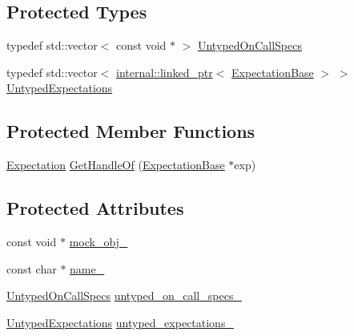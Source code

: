 \subsection*{Protected Types}
\begin{DoxyCompactItemize}
\item 
typedef std\+::vector$<$ const void $\ast$ $>$ \hyperlink{classtesting_1_1internal_1_1_untyped_function_mocker_base_a29cc87ed60ad0218432aa777abba7dbb}{Untyped\+On\+Call\+Specs}
\item 
typedef std\+::vector$<$ \hyperlink{classtesting_1_1internal_1_1linked__ptr}{internal\+::linked\+\_\+ptr}$<$ \hyperlink{classtesting_1_1internal_1_1_expectation_base}{Expectation\+Base} $>$ $>$ \hyperlink{classtesting_1_1internal_1_1_untyped_function_mocker_base_a36480bd395e110b4eae5b0d0402de966}{Untyped\+Expectations}
\end{DoxyCompactItemize}
\subsection*{Protected Member Functions}
\begin{DoxyCompactItemize}
\item 
\hyperlink{classtesting_1_1_expectation}{Expectation} \hyperlink{classtesting_1_1internal_1_1_untyped_function_mocker_base_a7705611c4a63df16cddb0674878c403a}{Get\+Handle\+Of} (\hyperlink{classtesting_1_1internal_1_1_expectation_base}{Expectation\+Base} $\ast$exp)
\end{DoxyCompactItemize}
\subsection*{Protected Attributes}
\begin{DoxyCompactItemize}
\item 
const void $\ast$ \hyperlink{classtesting_1_1internal_1_1_untyped_function_mocker_base_adf35c589969bb985668616031cb9ed56}{mock\+\_\+obj\+\_\+}
\item 
const char $\ast$ \hyperlink{classtesting_1_1internal_1_1_untyped_function_mocker_base_a2d472077b9a8d3758caaec5770259f70}{name\+\_\+}
\item 
\hyperlink{classtesting_1_1internal_1_1_untyped_function_mocker_base_a29cc87ed60ad0218432aa777abba7dbb}{Untyped\+On\+Call\+Specs} \hyperlink{classtesting_1_1internal_1_1_untyped_function_mocker_base_aed2a1913f6c03fd47c8900039556be34}{untyped\+\_\+on\+\_\+call\+\_\+specs\+\_\+}
\item 
\hyperlink{classtesting_1_1internal_1_1_untyped_function_mocker_base_a36480bd395e110b4eae5b0d0402de966}{Untyped\+Expectations} \hyperlink{classtesting_1_1internal_1_1_untyped_function_mocker_base_aae4a42a4bace1fcb0cd4bdf1ddd40277}{untyped\+\_\+expectations\+\_\+}
\end{DoxyCompactItemize}


